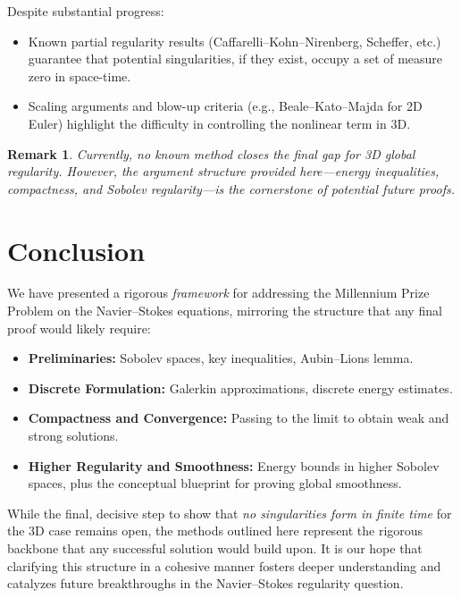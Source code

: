 \documentclass[11pt]{article}
\newtheorem{remark}[theorem]{Remark}
\numberwithin{equation}{section}
\begin{document}
Despite substantial progress:
\begin{itemize}[leftmargin=2em]
\item Known partial regularity results (Caffarelli--Kohn--Nirenberg, Scheffer, etc.)
      guarantee that potential singularities, if they exist, occupy a set
      of measure zero in space-time.
\item Scaling arguments and blow-up criteria (e.g., Beale--Kato--Majda for 2D Euler)
      highlight the difficulty in controlling the nonlinear term in 3D.
\end{itemize}

\begin{remark}
Currently, no known method closes the final gap for 3D global regularity.
However, the argument structure provided here---energy inequalities,
compactness, and Sobolev regularity---is the cornerstone of potential future proofs.
\end{remark}

\section{Conclusion}\label{sec:conclusion}

We have presented a rigorous \emph{framework} for addressing the Millennium Prize Problem
on the Navier--Stokes equations, mirroring the structure that any final proof
would likely require:
\begin{itemize}[leftmargin=2em]
\item \textbf{Preliminaries:} Sobolev spaces, key inequalities, Aubin--Lions lemma.
\item \textbf{Discrete Formulation:} Galerkin approximations, discrete energy estimates.
\item \textbf{Compactness and Convergence:} Passing to the limit to obtain weak and
      strong solutions.
\item \textbf{Higher Regularity and Smoothness:} Energy bounds in higher Sobolev spaces,
      plus the conceptual blueprint for proving global smoothness.
\end{itemize}

While the final, decisive step to show that \emph{no singularities form in finite time}
for the 3D case remains open, the methods outlined here represent the rigorous backbone
that any successful solution would build upon. It is our hope that clarifying this
structure in a cohesive manner fosters deeper understanding and catalyzes future
breakthroughs in the Navier--Stokes regularity question.
\end{document}
